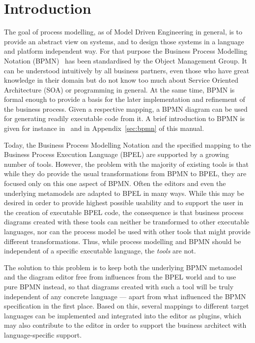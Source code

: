 \chapter{Introduction}
\label{sec:intro}


The goal of process modelling, as of Model Driven Engineering in general, is to
provide an abstract view on systems, and to design those systems in a language
and platform independent way.  For that purpose the Business Process Modelling
Notation (BPMN)~\cite{omg2009bpmn} has been standardised by the Object Management
Group.  It can be understood intuitively by all business partners, even those who
have great knowledge in their domain but do not know too much about Service
Oriented Architecture (SOA) or programming in general.  At the same time, BPMN is
formal enough to provide a basis for the later implementation and refinement of
the business process.  Given a respective mapping, a BPMN diagram can be used for
generating readily executable code from it.  A brief introduction to BPMN is given
for instance in~\cite{white2004introduction} and in Appendix~\ref{sec:bpmn} of
this manual.

Today, the Business Process Modelling Notation and the specified mapping to the
Business Process Execution Language (BPEL) are supported by a growing number of
tools.  However, the problem with the majority of existing tools is that while
they do provide the usual transformations from BPMN to BPEL, they are focused
only on this one aspect of BPMN.  Often the editors and even the underlying
metamodels are adapted to BPEL in many ways.  While this may be desired in order
to provide highest possible usability and to support the user in the creation of
executable BPEL code, the consequence is that business process diagrams created
with these tools can neither be transformed to other executable languages, nor
can the process model be used with other tools that might provide different
transformations.  Thus, while process modelling and BPMN should be independent of
a specific executable language, the \emph{tools} are not.

The solution to this problem is to keep both the underlying BPMN metamodel and
the diagram editor free from influences from the BPEL world and to use pure BPMN
instead, so that diagrams created with such a tool will be truly independent of
any concrete language --- apart from what influenced the BPMN specification in
the first place.  Based on this, several mappings to different target languages
can be implemented and integrated into the editor as plugins, which may also
contribute to the editor in order to support the business architect with
language-specific support.

